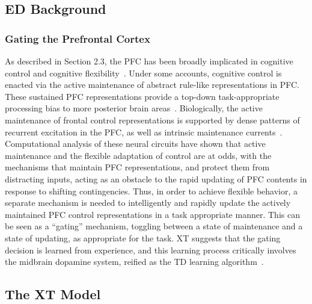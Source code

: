 \documentclass[man]{apa}
\begin{document}
\subsection{ED Background} 
 
\subsubsection{Gating the Prefrontal Cortex} 

As described in Section 2.3, the PFC has been broadly implicated in cognitive control and cognitive flexibility~\cite{Stuss:2000:WCSTLesion,Stuss:2001:StroopLesion}.  Under some accounts, cognitive control is enacted via the active maintenance of abstract rule-like representations in PFC.  These sustained PFC representations provide a top-down task-appropriate processing bias to more posterior brain areas~\cite{CohenJD:1990:Stroop}.  Biologically, the active maintenance of frontal control representations is supported by dense patterns of recurrent excitation in the PFC, as well as intrinsic maintenance currents~\cite{Goldman-RakicPS:1987:PFC_Maintenance}.  Computational analysis of these neural circuits have shown that active maintenance and the flexible adaptation of control are at odds, with the mechanisms that maintain PFC representations, and protect them from distracting inputs, acting as an obstacle to the rapid updating of PFC contents in response to shifting contingencies.  Thus, in order to achieve flexible behavior, a separate mechanism is needed to intelligently and rapidly update the actively maintained PFC control representations in a task appropriate manner.  This can be seen as a ``gating'' mechanism, toggling between a state of maintenance and a state of updating, as appropriate for the task.  XT suggests that the gating decision is learned from experience, and this learning process critically involves the midbrain dopamine system, reified as the TD learning algorithm~\cite{BraverTS:2000:Control,RougierNP:2005:XT,BartoAG:1994:TDLearning}.

\subsection{The XT Model} 

\end{document}
